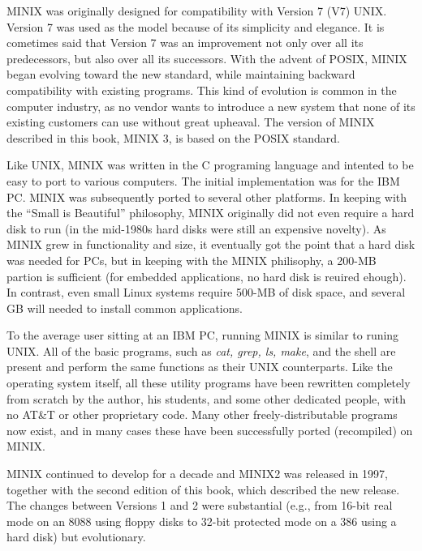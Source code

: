 \documentclass{book}
\newcommand {\sys} [1] {\textsl{#1}}
\begin{document}
MINIX was originally designed for compatibility with Version 7 (V7) UNIX. Version 7 was used as the model because of its simplicity and elegance.
It is cometimes said that Version 7 was an improvement not only over all its predecessors, but also over all its successors.
With the advent of POSIX, MINIX began evolving toward the new standard, while maintaining backward compatibility with existing programs.
This kind of evolution is common in the computer industry, as no vendor wants to introduce a new system 
that none of its existing customers can use without great upheaval.
The version of MINIX described in this book, MINIX 3, is based on the POSIX standard.

Like UNIX, MINIX was written in the C programing language and intented to be easy to port to various computers.
The initial implementation was for the IBM PC.
MINIX was subsequently ported to several other platforms.
In keeping with the ``Small is Beautiful'' philosophy, MINIX originally did not even require a hard disk to run 
(in the mid-1980s hard disks were still an expensive novelty).
As MINIX grew in functionality and size, it eventually got the point that a hard disk was needed for PCs,
but in keeping with the MINIX philisophy, a 200-MB partion is sufficient (for embedded applications, no hard disk is reuired ehough).
In contrast, even small Linux systems require 500-MB of disk space, and several GB will needed to install common applications.

To the average user sitting at an IBM PC, running MINIX is similar to runing UNIX.
All of the basic programs, such as \sys{cat, grep, ls, make}, and the shell are present and perform the same functions as their UNIX counterparts. 
Like the operating system itself, all these utility programs have been rewritten completely from scratch by the author, 
his students, and some other dedicated people, with no AT\&T or other proprietary code.
Many other freely-distributable programs now exist, and in many cases these have been successfully ported (recompiled) on MINIX.

MINIX continued to develop for a decade and MINIX2 was released in 1997, together with the second edition of this book, which described the new release.
The changes between Versions 1 and 2 were substantial (e.g., from 16-bit real mode on an 8088 using floppy disks 
to 32-bit protected mode on a 386 using a hard disk) but evolutionary.
\end{document}
